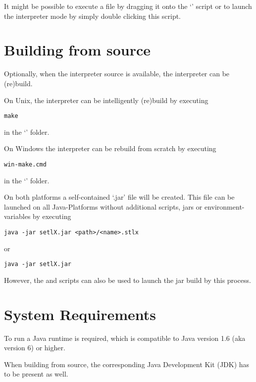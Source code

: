 It might be possible to execute a \SetlX{} file by dragging it onto the `' script or to launch the interpreter mode by simply double clicking this script.

\section{Building from source}

Optionally, when the interpreter source is available, the interpreter can be (re)build.

On Unix, the interpreter can be intelligently (re)build by executing

\begin{lstlisting}[frame=none,numbers=none]
make
\end{lstlisting}

in the `' folder.

On Windows the interpreter can be rebuild from scratch by executing
\begin{lstlisting}[frame=none,numbers=none]
win-make.cmd
\end{lstlisting}

in the `' folder.

On both platforms a self-contained `.jar' file will be created. This file can be launched on all Java-Platforms without additional scripts, jars or environment-variables by executing

\begin{lstlisting}[frame=none,numbers=none]
java -jar setlX.jar <path>/<name>.stlx
\end{lstlisting}

or

\begin{lstlisting}[frame=none,numbers=none]
java -jar setlX.jar
\end{lstlisting}

However, the  and  scripts can also be used to launch the jar build by this process.

\section{System Requirements}

To run \setlX{} a Java runtime is required, which is compatible to Java version 1.6 (aka version 6) or higher.

When building from source, the corresponding Java Development Kit (JDK) has to be present as well.

